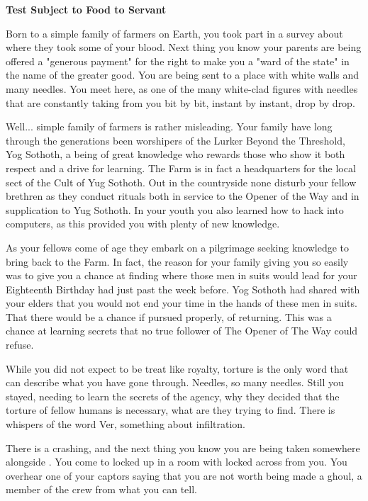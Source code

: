 \documentclass[char]{guildcamp4}
\begin{document}
\name{\cPlead{}}

\begin{center}{\bf Test Subject to Food to Servant}\end{center}

Born to a simple family of farmers on Earth, you took part in a survey about where they took some of your blood. Next thing you know your parents are being offered a "generous payment" for the right to make you a "ward of the state" in the name of the greater good. You are being sent to a place with white walls and many needles. You meet \cSpite{}  here, as one of the many white-clad figures with needles that are constantly taking from you bit by bit, instant by instant, drop by drop. 

Well... simple family of farmers is rather misleading. Your family have long through the generations been worshipers of the Lurker Beyond the Threshold, Yog Sothoth, a being of great knowledge who rewards those who show it both respect and a drive for learning. The Farm is in fact a headquarters for the local sect of the Cult of Yug Sothoth. Out in the countryside none disturb your fellow brethren as they conduct rituals both in service to the Opener of the Way and in supplication to Yug Sothoth. In your youth you also learned how to hack into computers, as this provided you with plenty of new knowledge.

As your fellows come of age they embark on a pilgrimage seeking knowledge to bring back to the Farm. In fact, the reason for your family giving you so easily was to give you a chance at finding where those men in suits would lead for your Eighteenth Birthday had just past the week before. Yog Sothoth had shared with your elders that you would not end your time in the hands of these men in suits. That there would be a chance if pursued properly, of returning. This was a chance at learning secrets that no true follower of The Opener of The Way could refuse. 

While you did not expect to be treat like royalty, torture is the only word that can describe what you have gone through. Needles, so many needles. Still you stayed, needing to learn the secrets of the agency, why they decided that the torture of fellow humans is necessary, what are they trying to find. There is whispers of the word Ver, something about infiltration.

There is a crashing, and the next thing you know you are being taken somewhere alongside \cSpite{}. You come to locked up in a room with \cSpite{} locked across from you. You overhear one of your captors saying that you are not worth being made a ghoul, a member of the crew from what you can tell.
\end{document}
